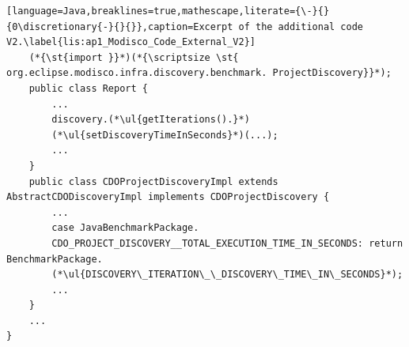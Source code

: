 \begin{lstlisting}[language=Java,breaklines=true,mathescape,literate={\-}{}{0\discretionary{-}{}{}},caption=Excerpt of the additional code V2.\label{lis:ap1_Modisco_Code_External_V2}]
	(*{\st{import }}*)(*{\scriptsize \st{ org.eclipse.modisco.infra.discovery.benchmark. ProjectDiscovery}}*);
	public class Report {
		...
		discovery.(*\ul{getIterations().}*) 
		(*\ul{setDiscoveryTimeInSeconds}*)(...);
		...
	}
	public class CDOProjectDiscoveryImpl extends AbstractCDODiscoveryImpl implements CDOProjectDiscovery {
		...
		case JavaBenchmarkPackage.
		CDO_PROJECT_DISCOVERY__TOTAL_EXECUTION_TIME_IN_SECONDS: return BenchmarkPackage.
		(*\ul{DISCOVERY\_ITERATION\_\_DISCOVERY\_TIME\_IN\_SECONDS}*);
		...
	}
	...
}
\end{lstlisting}

